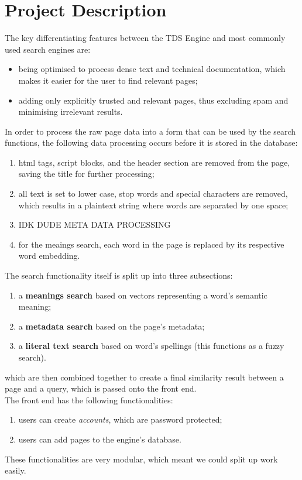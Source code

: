 \section{Project Description}

The key differentiating features between the TDS Engine and most commonly used search engines are:

\begin{itemize}
  \item being optimised to process dense text and technical documentation, which makes it easier for the user to find relevant pages;
  \item adding only explicitly trusted and relevant pages, thus excluding spam and minimising irrelevant results.
\end{itemize}

In order to process the raw page data into a form that can be used by the search functions, the following data processing occurs before it is stored in the database:
\begin{enumerate}
  \item html tags, script blocks, and the header section are removed from the page, saving the title for further processing;
  \item all text is set to lower case, stop words and special characters are removed, which results in a plaintext string where words are separated by one space;
  \item IDK DUDE META DATA PROCESSING
  \item for the meaings search, each word in the page is replaced by its respective word embedding. 
\end{enumerate}

The search functionality itself is split up into three subsections:
\begin{enumerate}
  \item a \textbf{meanings search} based on vectors representing a word's semantic meaning;
  \item a \textbf{metadata search} based on the page's metadata;
  \item a \textbf{literal text search} based on word's spellings (this functions as a fuzzy search).
\end{enumerate}
which are then combined together to create a final similarity result between a page and a query, which is passed onto the front end. \\

The front end has the following functionalities:
\begin{enumerate}
  \item users can create \textit{accounts}, which are password protected;
  \item users can add pages to the engine's database.
\end{enumerate}

These functionalities are very modular, which meant we could split up work easily.  
